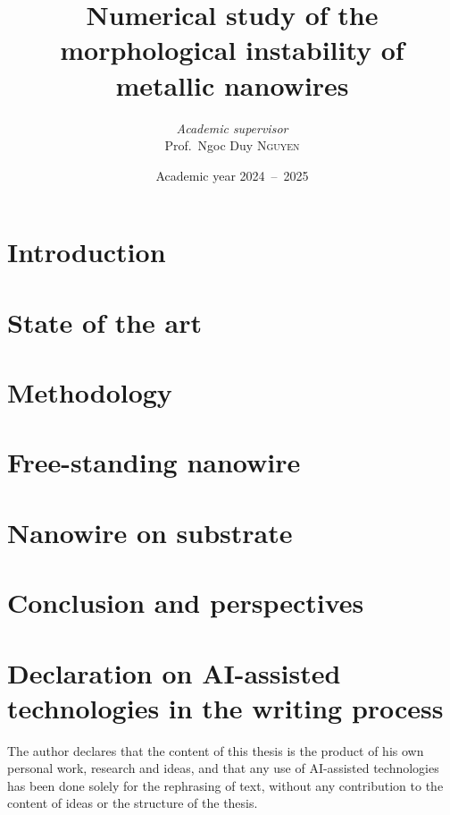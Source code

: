 \documentclass[twoside, 12pt]{extreport}
\institute{University of Liège}
\title{Numerical study of the morphological instability of metallic nanowires}
\author{\textit{Academic supervisor}\\Prof.\ Ngoc Duy \textsc{Nguyen}}
\date{Academic year 2024\ --\ 2025}
\begin{document}
    \maketitle
    \chapter*{Introduction}\label{chap:intro}
    

    \chapter{State of the art}\label{chap:1-sota}
    

    \chapter{Methodology}\label{chap:2-methodology}
    

    \chapter{Free-standing nanowire}\label{chap:3-results}
    

    \chapter{Nanowire on substrate}\label{chap:4-substrate}
    
    
    \chapter{Conclusion and perspectives}\label{chap:concl}
    

    \chapter*{Declaration on AI-assisted technologies in the writing process}
    The author declares that the content of this thesis is the product of his own personal work, research and ideas, and that any use of AI-assisted technologies has been done solely for the rephrasing of text, without any contribution to the content of ideas or the structure of the thesis.

    \newpage
    
    \newpage
    
    \printbibliography
\end{document}

